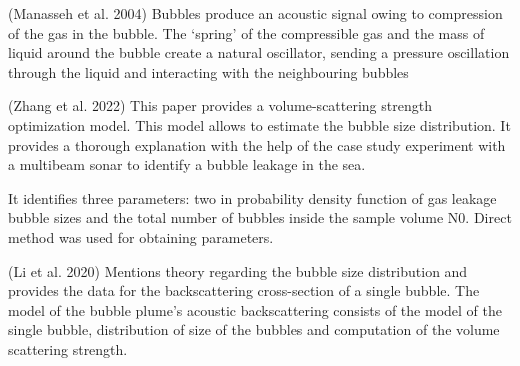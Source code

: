 (Manasseh et al. 2004\cite{manasseh_anisotropy_2004}) Bubbles produce an acoustic signal owing to compression of the gas in the bubble. The ‘spring’ of the compressible gas and the mass of liquid around the bubble create a natural oscillator, sending a pressure oscillation through the liquid and interacting with the neighbouring bubbles

(Zhang et al. 2022\cite{zhang_efficient_2022}) This paper provides a volume-scattering strength optimization model. This model allows to estimate the bubble size distribution. It provides a thorough explanation with the help of the case study experiment with a multibeam sonar to identify a bubble leakage in the sea.

It identifies three parameters: two in probability density function of gas leakage bubble sizes and the total number of bubbles inside the sample volume N0. Direct method was used for obtaining parameters.

(Li et al. 2020\cite{li_broadband_2020}) Mentions theory regarding the bubble size distribution and provides the data for the backscattering cross-section of a single bubble. The model of the bubble plume’s acoustic backscattering consists of the model of the single bubble, distribution of size of the bubbles and computation of the volume scattering strength.

